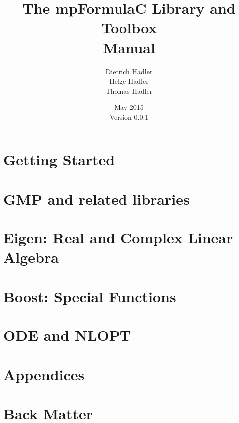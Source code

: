 \documentclass[12pt,a4paper,openany]{book}
\numberwithin{equation}{section}
\begin{document}
\begin{titlepage}
\author{
Dietrich Hadler\\
Helge Hadler\\
Thomas Hadler
} 
\title{The mpFormulaC Library and Toolbox\\[0.2cm]
 Manual} 
\date{May 2015 \\ 
Version {0.0.1}}
\maketitle
\end{titlepage}

\thispagestyle{empty}

\setcounter{page}{1}
\frontmatter
\maketitle

\setlength{\parindent}{0pt}



\tableofcontents
\listoftables
\listoffigures

\mainmatter
\setlength{\parindent}{0pt}

\part{Getting Started}



\part{GMP and related libraries}



\part{Eigen: Real and Complex Linear Algebra}




\part{Boost: Special Functions}



\part{ODE and NLOPT}



\part{Appendices}
\begin{appendices}

\end{appendices}


\part{Back Matter}
\backmatter
 
 
\printnomenclature[1.2in]
\printindex
\end{document}
